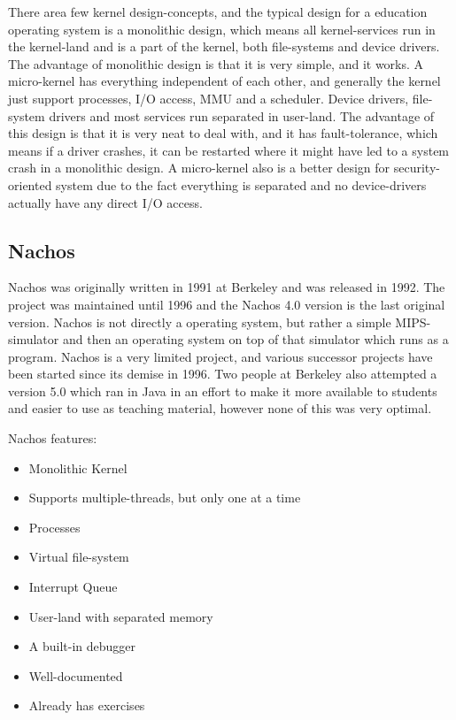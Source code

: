 There area few kernel design-concepts, and the typical design for a education operating system is a monolithic design, which means all kernel-services run in the kernel-land and is a part of the kernel, both file-systems and device drivers. The advantage of monolithic design is that it is very simple, and it works.
A micro-kernel has everything independent of each other, and generally the kernel just support processes, I/O access, MMU and a scheduler. Device drivers, file-system drivers and most services run separated in user-land. The advantage of this design is that it is very neat to deal with, and it has fault-tolerance, which means if a driver crashes, it can be restarted where it might have led to a system crash in a monolithic design. A micro-kernel also is a better design for security-oriented system due to the fact everything is separated and no device-drivers actually have any direct I/O access.

\subsection{Nachos}

Nachos was originally written in 1991 at Berkeley and was released in 1992. The project was maintained until 1996 and the Nachos 4.0 version is the last original version. Nachos is not directly a operating system, but rather a simple MIPS-simulator and then an operating system on top of that simulator which runs as a program. Nachos is a very limited project, and various successor projects have been started since its demise in 1996. Two people at Berkeley also attempted a version 5.0 which ran in Java in an effort to make it more available to students and easier to use as teaching material, however none of this was very optimal.

Nachos features\cite{NachosRef}:

\begin{itemize}
  \item Monolithic Kernel
  \item Supports multiple-threads, but only one at a time
  \item Processes
  \item Virtual file-system
  \item Interrupt Queue
  \item User-land with separated memory
  \item A built-in debugger
  \item Well-documented
  \item Already has exercises
\end{itemize}

